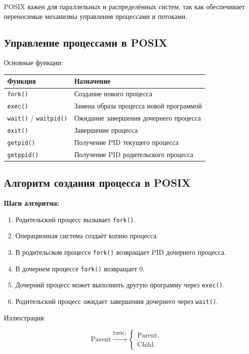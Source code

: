 \documentclass[12pt,a4paper]{article}
\begin{document}
POSIX важен для параллельных и распределённых систем, так как обеспечивает переносимые механизмы управления процессами и потоками.

\subsection{Управление процессами в POSIX}

Основные функции:
\begin{center}
\begin{tabular}{|p{5cm}|p{9cm}|}
\hline
\textbf{Функция} & \textbf{Назначение} \\
\hline
\texttt{fork()} & Создание нового процесса \\
\hline
\texttt{exec()} & Замена образа процесса новой программой \\
\hline
\texttt{wait()} / \texttt{waitpid()} & Ожидание завершения дочернего процесса \\
\hline
\texttt{exit()} & Завершение процесса \\
\hline
\texttt{getpid()} & Получение PID текущего процесса \\
\hline
\texttt{getppid()} & Получение PID родительского процесса \\
\hline
\end{tabular}
\end{center}

\subsection{Алгоритм создания процесса в POSIX}

\textbf{Шаги алгоритма:}
\begin{enumerate}
    \item Родительский процесс вызывает \texttt{fork()}.
    \item Операционная система создаёт копию процесса.
    \item В родительском процессе \texttt{fork()} возвращает PID дочернего процесса.
    \item В дочернем процессе \texttt{fork()} возвращает $0$.
    \item Дочерний процесс может выполнить другую программу через \texttt{exec()}.
    \item Родительский процесс ожидает завершения дочернего через \texttt{wait()}.
\end{enumerate}

Иллюстрация:

\[
\text{Parent}
\xrightarrow{\texttt{fork()}}
\begin{cases}
\text{Parent},\\
\text{Child}.
\end{cases}
\]
\end{document}
